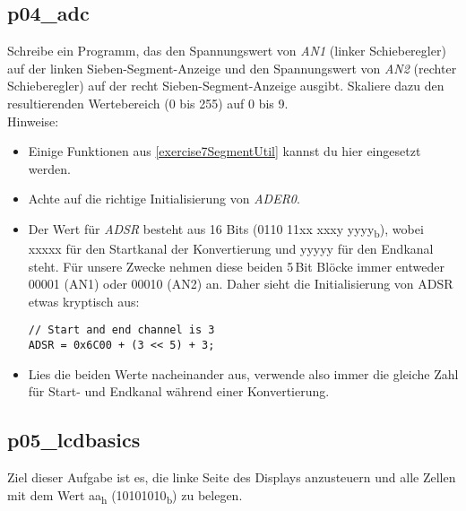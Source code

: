 \documentclass[
  accentcolor=tud1c,	%
  colorbacktitle,		%
  inverttitle,			%
  german,				%
  twoside
]{tudexercise}
\begin{document}
\subsection{p04\_adc}
Schreibe ein Programm, das den Spannungswert von \emph{AN1} (linker Schieberegler) auf der linken Sieben-Segment-Anzeige und den Spannungswert von \emph{AN2} (rechter Schieberegler) auf der recht Sieben-Segment-Anzeige ausgibt.
Skaliere dazu den resultierenden Wertebereich (0 bis 255) auf 0 bis 9.\\
Hinweise:
\begin{itemize}
\item Einige Funktionen aus \ref{exercise7SegmentUtil} kannst du hier eingesetzt werden.

\item Achte auf die richtige Initialisierung von \textit{ADER0}.

\item Der Wert für \textit{ADSR} besteht aus 16 Bits (0110 11xx xxxy yyyy\textsubscript{b}), wobei xxxxx für den Startkanal der Konvertierung und yyyyy für den Endkanal steht. Für unsere Zwecke nehmen diese beiden 5\,Bit Blöcke immer entweder 00001 (AN1) oder 00010 (AN2) an.
Daher sieht die Initialisierung von ADSR etwas kryptisch aus:
\begin{verbatim}
// Start and end channel is 3
ADSR = 0x6C00 + (3 << 5) + 3;
\end{verbatim}

\item
Lies die beiden Werte nacheinander aus, verwende also immer die gleiche Zahl für Start- und Endkanal während einer Konvertierung.

\end{itemize}

\subsection{p05\_lcdbasics}
Ziel dieser Aufgabe ist es, die linke Seite des Displays anzusteuern und alle Zellen mit dem Wert aa\textsubscript{h} (10101010\textsubscript{b}) zu belegen.
\end{document}
